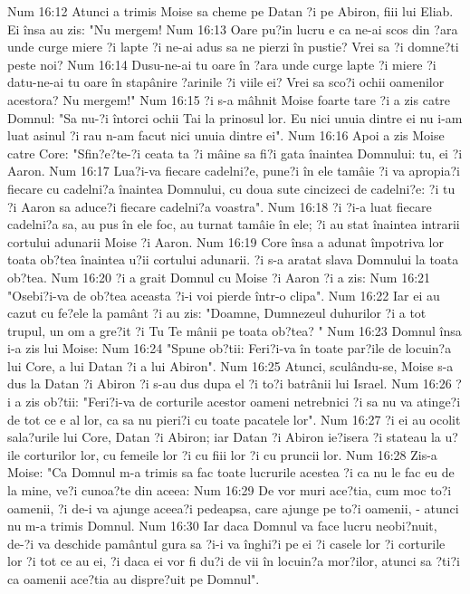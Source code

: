 Num 16:12  Atunci a trimis Moise sa cheme pe Datan ?i pe Abiron, fiii lui Eliab. Ei însa au zis: "Nu mergem!
Num 16:13  Oare pu?in lucru e ca ne-ai scos din ?ara unde curge miere ?i lapte ?i ne-ai adus sa ne pierzi în pustie? Vrei sa ?i domne?ti peste noi?
Num 16:14  Dusu-ne-ai tu oare în ?ara unde curge lapte ?i miere ?i datu-ne-ai tu oare în stapânire ?arinile ?i viile ei? Vrei sa sco?i ochii oamenilor acestora? Nu mergem!"
Num 16:15  ?i s-a mâhnit Moise foarte tare ?i a zis catre Domnul: "Sa nu-?i întorci ochii Tai la prinosul lor. Eu nici unuia dintre ei nu i-am luat asinul ?i rau n-am facut nici unuia dintre ei".
Num 16:16  Apoi a zis Moise catre Core: "Sfin?e?te-?i ceata ta ?i mâine sa fi?i gata înaintea Domnului: tu, ei ?i Aaron.
Num 16:17  Lua?i-va fiecare cadelni?e, pune?i în ele tamâie ?i va apropia?i fiecare cu cadelni?a înaintea Domnului, cu doua sute cincizeci de cadelni?e: ?i tu ?i Aaron sa aduce?i fiecare cadelni?a voastra".
Num 16:18  ?i ?i-a luat fiecare cadelni?a sa, au pus în ele foc, au turnat tamâie în ele; ?i au stat înaintea intrarii cortului adunarii Moise ?i Aaron.
Num 16:19  Core însa a adunat împotriva lor toata ob?tea înaintea u?ii cortului adunarii. ?i s-a aratat slava Domnului la toata ob?tea.
Num 16:20  ?i a grait Domnul cu Moise ?i Aaron ?i a zis:
Num 16:21  "Osebi?i-va de ob?tea aceasta ?i-i voi pierde într-o clipa".
Num 16:22  Iar ei au cazut cu fe?ele la pamânt ?i au zis: "Doamne, Dumnezeul duhurilor ?i a tot trupul, un om a gre?it ?i Tu Te mânii pe toata ob?tea? "
Num 16:23  Domnul însa i-a zis lui Moise:
Num 16:24  "Spune ob?tii: Feri?i-va în toate par?ile de locuin?a lui Core, a lui Datan ?i a lui Abiron".
Num 16:25  Atunci, sculându-se, Moise s-a dus la Datan ?i Abiron ?i s-au dus dupa el ?i to?i batrânii lui Israel.
Num 16:26  ?i a zis ob?tii: "Feri?i-va de corturile acestor oameni netrebnici ?i sa nu va atinge?i de tot ce e al lor, ca sa nu pieri?i cu toate pacatele lor".
Num 16:27  ?i ei au ocolit sala?urile lui Core, Datan ?i Abiron; iar Datan ?i Abiron ie?isera ?i stateau la u?ile corturilor lor, cu femeile lor ?i cu fiii lor ?i cu pruncii lor.
Num 16:28  Zis-a Moise: "Ca Domnul m-a trimis sa fac toate lucrurile acestea ?i ca nu le fac eu de la mine, ve?i cunoa?te din aceea:
Num 16:29  De vor muri ace?tia, cum moc to?i oamenii, ?i de-i va ajunge aceea?i pedeapsa, care ajunge pe to?i oamenii, - atunci nu m-a trimis Domnul.
Num 16:30  Iar daca Domnul va face lucru neobi?nuit, de-?i va deschide pamântul gura sa ?i-i va înghi?i pe ei ?i casele lor ?i corturile lor ?i tot ce au ei, ?i daca ei vor fi du?i de vii în locuin?a mor?ilor, atunci sa ?ti?i ca oamenii ace?tia au dispre?uit pe Domnul".
